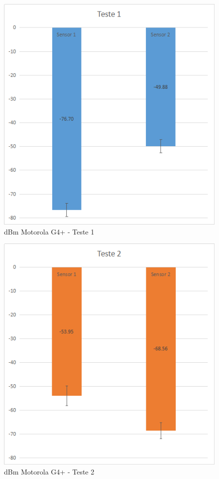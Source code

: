 \begin{figure}[htb]
	\caption{\label{fig:modulos-esp}dBm Motorola G4+ - Teste 1}
	\begin{center}
		\includegraphics[width=1\textwidth]{060-testes/data-analisis/distance-mg4plus-netflix/target-Teste1.png}
	\end{center}
\end{figure}

\begin{figure}[htb]
	\caption{\label{fig:modulos-esp}dBm Motorola G4+ - Teste 2}
	\begin{center}
		\includegraphics[width=1\textwidth]{060-testes/data-analisis/distance-mg4plus-netflix/target-Teste2.png}
	\end{center}
\end{figure}
